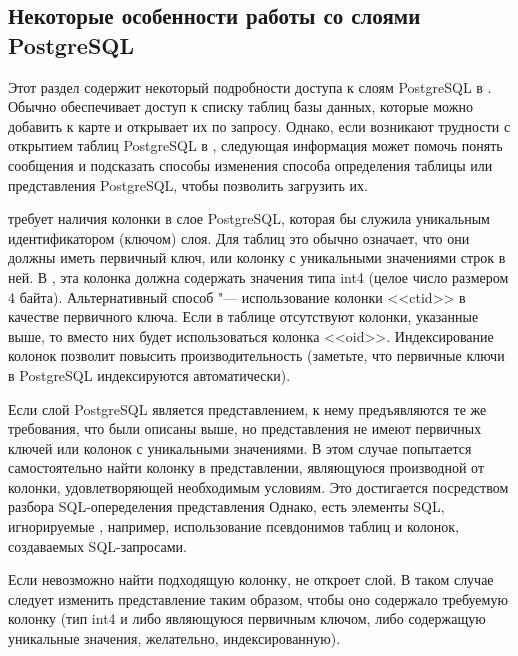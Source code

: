 \subsection{Некоторые особенности работы со слоями PostgreSQL}
\label{sec:postgis_details}

Этот раздел содержит некоторый подробности доступа к слоям PostgreSQL в \qg.
Обычно \qg обеспечивает доступ к списку таблиц базы данных, которые можно
добавить к карте и открывает их по запросу. Однако, если возникают трудности
с открытием таблиц PostgreSQL в \qg, следующая информация может помочь
понять сообщения \qg и подсказать способы изменения способа определения
таблицы или представления PostgreSQL, чтобы позволить \qg загрузить их.

\qg требует наличия колонки в слое PostgreSQL, которая бы служила уникальным
идентификатором (ключом) слоя. Для таблиц это обычно означает, что они должны
иметь первичный ключ, или колонку с уникальными значениями строк в ней.
В \qg, эта колонка должна содержать значения типа int4 (целое число размером
4 байта). Альтернативный способ "--- использование колонки <<ctid>> в качестве
первичного ключа. Если в таблице отсутствуют колонки, указанные выше, то
вместо них будет использоваться колонка <<oid>>. Индексирование колонок позволит
повысить производительность (заметьте, что первичные ключи в PostgreSQL
индексируются автоматически).

Если слой PostgreSQL является представлением, к нему предъявляются те же
требования, что были описаны выше, но представления не имеют первичных
ключей или колонок с уникальными значениями. В этом случае \qg попытается
самостоятельно найти колонку в представлении, являющуюся производной от
колонки, удовлетворяющей необходимым условиям. %
Это достигается посредством разбора SQL-опеределения представления %
Однако, есть элементы SQL, игнорируемые \qg, например, использование
псевдонимов таблиц и колонок, создаваемых SQL-запросами.

Если невозможно найти подходящую колонку, \qg не откроет слой. В таком
случае следует изменить представление таким образом, чтобы оно содержало
требуемую колонку (тип int4 и либо являющуюся первичным ключом, либо
содержащую уникальные значения, желательно, индексированную).

